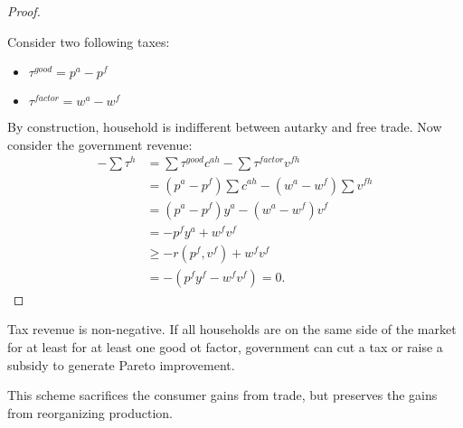 \begin{proof}
    \

    Consider two following taxes:
    \begin{itemize}
        \item $\tau ^{good} = p^a - p^f$
        \item $\tau ^{factor} = w^a - w^f$
    \end{itemize}
    By construction, household is indifferent between autarky and free trade.
    Now consider the government revenue:
    \begin{align*}
        - \sum \tau ^h &= \sum \tau ^{good} c^{ah} - \sum \tau ^{factor} v^{fh} \\ 
        &= (p^a - p^f) \sum c^{ah} - (w^a - w^f) \sum v^{fh} \\
        &= (p^a - p^f) y^a - (w^a - w^f) v^f \\
        &= -p^f y^a + w^f v^f \\
        & \geq -r(p^f, v^f) + w^f v^f \\
        &= -(p^f y^f - w^f v^f) = 0.
    \end{align*}
\end{proof}

Tax revenue is non-negative. If all households are on the same side of the market
for at least for at least one good ot factor, government can cut a tax or raise a subsidy
to generate Pareto improvement.

This scheme sacrifices the consumer gains from trade,
but preserves the gains from reorganizing production.